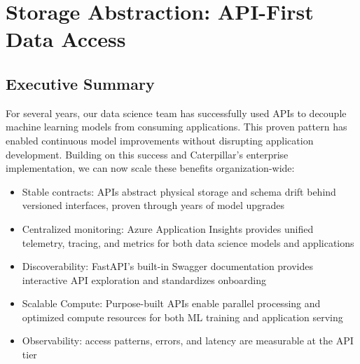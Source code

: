 \documentclass[12pt, a4paper]{article}
\begin{document}
\section{Storage Abstraction: API-First Data Access}

\subsection{Executive Summary}
For several years, our data science team has successfully used APIs to decouple machine learning models from consuming applications. This proven pattern has enabled continuous model improvements without disrupting application development. Building on this success and Caterpillar's enterprise implementation, we can now scale these benefits organization-wide:

\begin{itemize}[leftmargin=*, nosep]
    \item Stable contracts: APIs abstract physical storage and schema drift behind versioned interfaces, proven through years of model upgrades
    \item Centralized monitoring: Azure Application Insights provides unified telemetry, tracing, and metrics for both data science models and applications
    \item Discoverability: FastAPI's built-in Swagger documentation provides interactive API exploration and standardizes onboarding
    \item Scalable Compute: Purpose-built APIs enable parallel processing and optimized compute resources for both ML training and application serving
    \item Observability: access patterns, errors, and latency are measurable at the API tier
\end{itemize}
\end{document}
